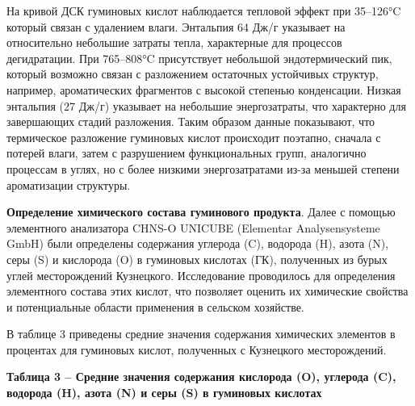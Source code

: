 На кривой ДСК гуминовых кислот наблюдается тепловой эффект при 35--126°C
который связан с удалением влаги. Энтальпия 64 Дж/г указывает на
относительно небольшие затраты тепла, характерные для процессов
дегидратации. При 765--808°C присутствует небольшой эндотермический пик,
который возможно связан с разложением остаточных устойчивых структур,
например, ароматических фрагментов с высокой степенью конденсации.
Низкая энтальпия (27 Дж/г) указывает на небольшие энергозатраты, что
характерно для завершающих стадий разложения. Таким образом данные
показывают, что термическое разложение гуминовых кислот происходит
поэтапно, сначала с потерей влаги, затем с разрушением функциональных
групп, аналогично процессам в углях, но с более низкими энергозатратами
из-за меньшей степени ароматизации структуры.

{\bfseries Определение химического состава гуминового продукта}. Далее с
помощью элементного анализатора CHNS-O UNICUBE (Elementar
Analysensysteme GmbH) были определены содержания углерода (C), водорода
(H), азота (N), серы (S) и кислорода (O) в гуминовых кислотах (ГК),
полученных из бурых углей месторождений Кузнецкого. Исследование
проводилось для определения элементного состава этих кислот, что
позволяет оценить их химические свойства и потенциальные области
применения в сельском хозяйстве.

В таблице 3 приведены средние значения содержания химических элементов в
процентах для гуминовых кислот, полученных с Кузнецкого месторождений.

{\bfseries Таблица 3 -- Средние значения содержания кислорода (O), углерода
(C), водорода (H), азота (N) и серы (S) в гуминовых кислотах}

